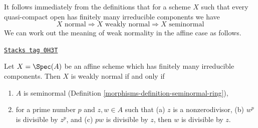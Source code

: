 It follows immediately from the definitions that for a scheme $X$ such
that every quasi-compact open has finitely many irreducible components
we have
$$
X\text{ normal} \Rightarrow
X\text{ weakly normal} \Rightarrow
X\text{ seminormal}
$$
We can work out the meaning of weak normality in the affine case as follows.

\begin{lemma}
\label{morphisms-lemma-affine-weakly-normal}
\href{https://stacks.math.columbia.edu/tag/0H3T}{\texttt{Stacks tag 0H3T}}

Let $X = \Spec(A)$ be an affine scheme which has finitely many
irreducible components. Then $X$ is weakly normal if and only if
\begin{enumerate}
\item $A$ is seminormal (Definition \ref{morphisms-definition-seminormal-ring}),
\item for a prime number $p$ and $z, w \in A$ such that
(a) $z$ is a nonzerodivisor, (b) $w^p$ is divisible by $z^p$, and
(c) $pw$ is divisible by $z$, then $w$ is divisible by $z$.
\end{enumerate}
\end{lemma}

